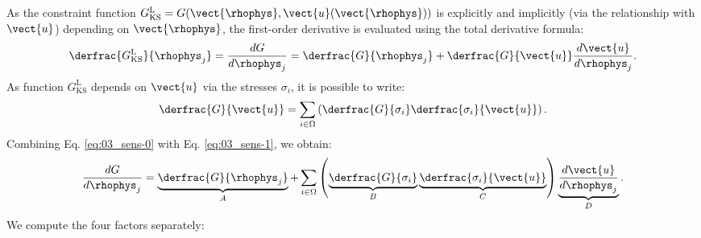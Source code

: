As the constraint function $G_{\text{KS}}^\text{L} = G(\vect{\rhophys}, \vect{u}(\vect{\rhophys}) )$ is explicitly and implicitly (via the relationship with $\vect{u}$) depending on $\vect{\rhophys}$, the first-order derivative is evaluated using the total derivative formula:
\begin{equation} \label{eq:03_sens-0}
    \derfrac{G_{\text{KS}}^\text{L}}{\rhophys_j} = \frac{d G}{d \rhophys_j} = \derfrac{G}{ \rhophys_j} + \derfrac{G}{\vect{u}} \frac{d \vect{u} }{d \rhophys_j}.
\end{equation}
As function $G_{\text{KS}}^\text{L}$ depends on $\vect{u}$ via the stresses $\sigma_i$, it is possible to write:
\begin{equation} \label{eq:03_sens-1}
    \derfrac{G}{\vect{u}} = \sum_{i \in \Omega} \left( \derfrac{G}{\sigma_i} \derfrac{\sigma_i}{\vect{u}}\right).
\end{equation}
Combining Eq. \ref{eq:03_sens-0} with Eq. \ref{eq:03_sens-1}, we obtain:
\begin{equation} \label{eq:03_sens-2}
    \frac{d G}{d \rhophys_j} = \underbrace{\derfrac{G}{\rhophys_j}}_A + \sum_{i \in \Omega} \left( \underbrace{\derfrac{G}{\sigma_i}}_B \underbrace{\derfrac{\sigma_i}{\vect{u}}}_C \right)  \underbrace{\frac{d \vect{u} }{d \rhophys_j}}_D.
\end{equation}
We compute the four factors separately:
